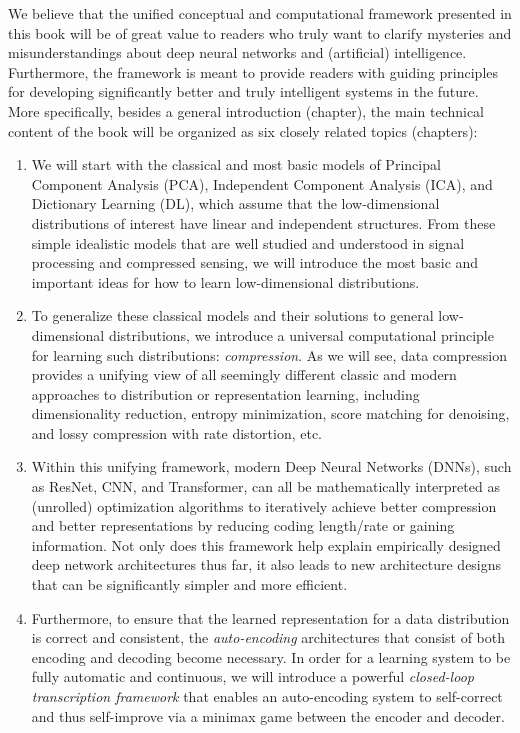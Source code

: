 \documentclass[../../book-main.tex]{subfiles}
\begin{document}
We believe that the unified conceptual and computational framework presented in this book will be of great value to readers who truly want to clarify mysteries and misunderstandings about deep neural networks and (artificial) intelligence. Furthermore, the framework is meant to provide readers with guiding principles for developing significantly better and truly intelligent systems in the future. More specifically, besides a general introduction (chapter), the main technical content of the book will be organized as six closely related topics (chapters):
\begin{enumerate}
\item We will start with the classical and most basic models of Principal Component Analysis (PCA), Independent Component Analysis (ICA), and Dictionary Learning (DL), which assume that the low-dimensional distributions of interest have linear and independent structures. From these simple idealistic models that are well studied and understood in signal processing and compressed sensing, we will introduce the most basic and important ideas for how to learn low-dimensional distributions.

\item To generalize these classical models and their solutions to general low-dimensional distributions, we introduce a universal computational principle for learning such distributions: {\em compression}. As we will see, data compression provides a unifying view of all seemingly different classic and modern approaches to distribution or representation learning, including dimensionality reduction, entropy minimization, score matching for denoising, and lossy compression with rate distortion, etc. 

\item Within this unifying framework, modern Deep Neural Networks (DNNs), such as ResNet, CNN, and Transformer, can all be mathematically interpreted as (unrolled) optimization algorithms to iteratively achieve better compression and better representations by reducing coding length/rate or gaining information. Not only does this framework help explain empirically designed deep network architectures thus far, it also leads to new architecture designs that can be significantly simpler and more efficient.

\item Furthermore, to ensure that the learned representation for a data distribution is correct and consistent, the {\em auto-encoding} architectures that consist of both encoding and decoding become necessary. In order for a learning system to be fully automatic and continuous, we will introduce a powerful {\em closed-loop transcription framework} that enables an auto-encoding system to self-correct and thus self-improve via a minimax game between the encoder and decoder.  


\end{enumerate}
\end{document}
